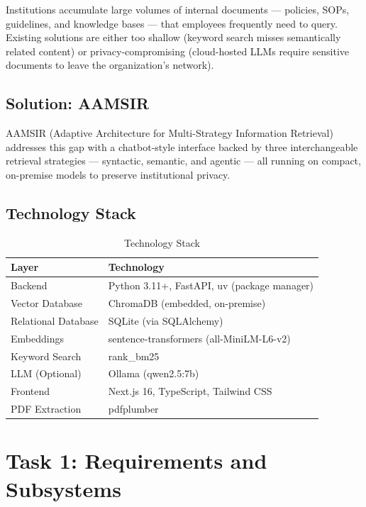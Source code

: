 \documentclass[11pt,a4paper]{article}
\begin{document}
Institutions accumulate large volumes of internal documents --- policies, SOPs, guidelines, and knowledge bases --- that employees frequently need to query. Existing solutions are either too shallow (keyword search misses semantically related content) or privacy-compromising (cloud-hosted LLMs require sensitive documents to leave the organization's network).

\subsection{Solution: AAMSIR}

AAMSIR (Adaptive Architecture for Multi-Strategy Information Retrieval) addresses this gap with a chatbot-style interface backed by three interchangeable retrieval strategies --- syntactic, semantic, and agentic --- all running on compact, on-premise models to preserve institutional privacy.

\subsection{Technology Stack}

\begin{table}[H]
\centering
\begin{tabular}{ll}
\toprule
\textbf{Layer} & \textbf{Technology} \\
\midrule
Backend & Python 3.11+, FastAPI, uv (package manager) \\
Vector Database & ChromaDB (embedded, on-premise) \\
Relational Database & SQLite (via SQLAlchemy) \\
Embeddings & sentence-transformers (all-MiniLM-L6-v2) \\
Keyword Search & rank\_bm25 \\
LLM (Optional) & Ollama (qwen2.5:7b) \\
Frontend & Next.js 16, TypeScript, Tailwind CSS \\
PDF Extraction & pdfplumber \\
\bottomrule
\end{tabular}
\caption{Technology Stack}
\end{table}


\section{Task 1: Requirements and Subsystems}
\end{document}
